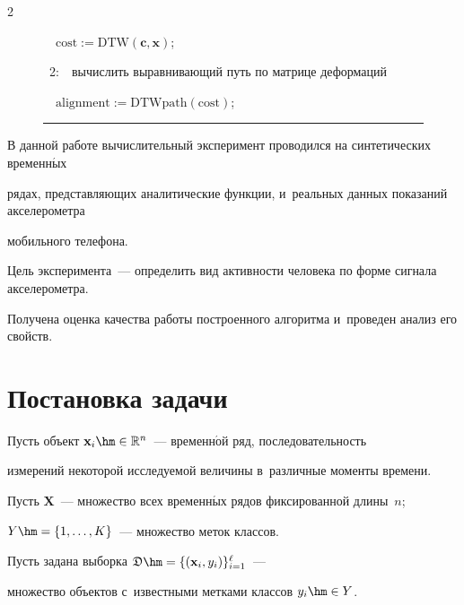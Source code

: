 \begin{multicols}{2}
\begin{figure}[b]
\hphantom{\ 1:}\ \ $\mathrm{cost} := \mathrm{DTW}(\mathbf{c}, \mathbf{x})$;





\ 2:\ \ {вычислить выравнивающий путь по матрице деформаций}\newline


\hphantom{\ 1:}\ \ $\mathrm{alignment} := \mathrm{DTWpath}(\mathrm{cost})$;





\vspace*{6pt}





\hrule


\end{figure}





В данной работе вычислительный эксперимент проводился на синтетических временн$\acute{\mbox{ы}}$х 


рядах, представляющих аналитические функции, и~реальных данных показаний акселерометра 


мобильного телефона.


Цель эксперимента~--- определить вид активности человека по форме сигнала акселерометра.


Получена оценка качества работы построенного алгоритма и~проведен анализ его свойств.





\section{Постановка задачи}





Пусть объект $\mathbf{x}_i \hm\in \mathbb{R}^n$~--- временн$\acute{\mbox{о}}$й ряд, последовательность 


измерений некоторой исследуемой величины в~различные моменты времени.


Пусть $\mathbf{X}$~--- множество всех временн$\acute{\mbox{ы}}$х рядов фиксированной длины~$n$; 


$Y \hm= \{1, \dots, K\}$~--- множество меток классов.


Пусть задана выборка $\mathfrak{D} \hm= \{(\mathbf{x}_i, y_i)\}_{i=1}^\ell$~--- 


множество объектов с~известными метками классов $y_i \hm\in Y$.






\end{multicols}
